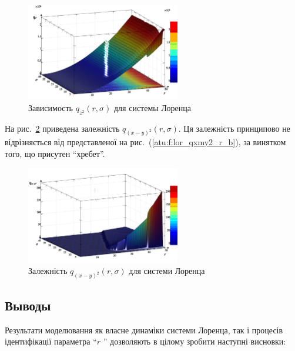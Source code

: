 \begin{figure}[ht!]
  \centerline{  \includegraphics[width=0.60\textwidth]{p/cha/lor/q2d/lor_qz2_r_sigma.png}  }
  \caption{Зависимость $q_{z^2}(r,\sigma)$ для системы Лоренца}
  \label{atu:f:lor_qz2_r_sigma}
\end{figure}

На рис.~\ref{atu:f:lor_qxmy2_r_sigma} приведена залежність
$ q_{(x-y)^2} (r, \sigma) $. Ця залежність принципово не відрізняється
від представленої на рис.~(\ref{atu:f:lor_qxmy2_r_b}), за винятком того, що
присутен ``хребет''.

\begin{figure}[ht!]
  \centerline{  \includegraphics[width=0.60\textwidth]{p/cha/lor/q2d/lor_qxmy2_r_sigma.png}  }
  \caption{Залежність $ q_{(x-y)^2} (r, \sigma) $ для системи Лоренца}
  \label{atu:f:lor_qxmy2_r_sigma}
\end{figure}



\subsection{Выводы}  %

Результати моделювання як власне динаміки системи Лоренца,
так і процесів ідентифікації параметра ``$r$ '' дозволяють в
цілому зробити наступні висновки:


